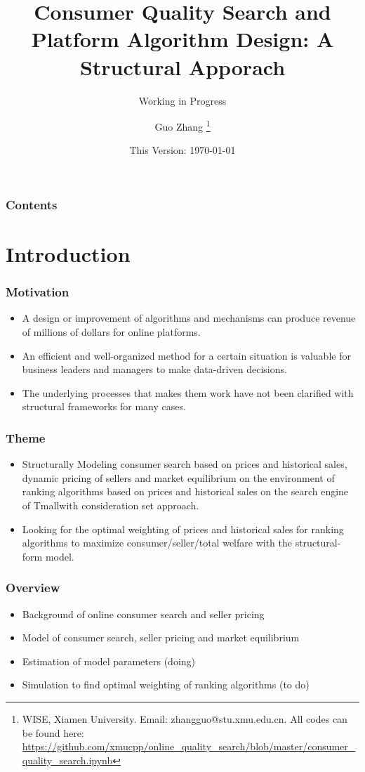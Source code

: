 \documentclass{beamer}
\title{Consumer Quality Search and Platform Algorithm Design: A Structural Apporach}
\subtitle{Working in Progress}
\author{
Guo Zhang
\thanks{WISE, Xiamen University. Email: zhangguo@stu.xmu.edu.cn. All codes can be found here: \url{https://github.com/xmucpp/online_quality_search/blob/master/consumer_quality_search.ipynb}}
}
\date{This Version: \today}
\begin{document}
\begin{frame}%
\maketitle
\end{frame}

\begin{frame}[plain]
\frametitle{Contents}
\tableofcontents[hideallsubsections]
\end{frame}

\section{Introduction}
\begin{frame}
\frametitle{Motivation}
\begin{itemize}
\item A design or improvement of algorithms and mechanisms can produce revenue of millions of dollars for online platforms.
\item An efficient and well-organized method for a certain situation is valuable for business leaders and managers to make data-driven decisions. 
\item The underlying processes that makes them work have not been clarified with structural frameworks for many cases.
\end{itemize}
\end{frame}

\begin{frame}
\frametitle{Theme}
\begin{itemize}
\item Structurally Modeling consumer search based on prices and historical sales, dynamic pricing of sellers and market equilibrium 
on the environment of ranking algorithms based on prices and historical sales on the search engine of Tmall\footnotemark with consideration set approach. 
\item Looking for the optimal weighting of prices and historical sales for ranking algorithms to maximize consumer/seller/total welfare with the structural-form model.
\end{itemize}
\end{frame}

\begin{frame}
\frametitle{Overview}
\begin{itemize}
\item Background of online consumer search and seller pricing
\item Model of consumer search, seller pricing and market equilibrium
\item Estimation of model parameters (doing)
\item Simulation to find optimal weighting of ranking algorithms (to do)
\end{itemize}
\end{frame}
\end{document}
